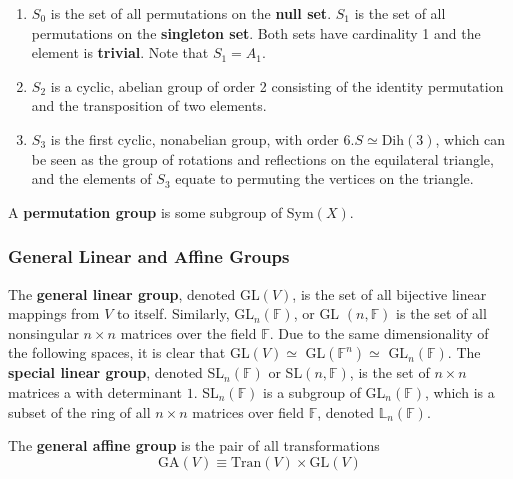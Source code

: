 \documentclass{article}
\begin{document}
      \begin{example}
      \begin{enumerate}
        \item $S_{0}$ is the set of all permutations on the \textbf{null set}. $S_{1}$ is the set of all permutations on the \textbf{singleton set}. Both sets have cardinality 1 and the element is \textbf{trivial}. Note that $S_{1} = A_{1}$. 
        \item $S_{2}$ is a cyclic, abelian group of order 2 consisting of the identity permutation and the transposition of two elements. 
        \item $S_{3}$ is the first cyclic, nonabelian group, with order 6.$S \simeq \text{Dih}(3)$, which can be seen as the group of rotations and reflections on the equilateral triangle, and the elements of $S_{3}$ equate to permuting the vertices on the triangle. 
      \end{enumerate}
      \end{example}

      \begin{definition}
        A \textbf{permutation group} is some subgroup of Sym$(X)$. 
      \end{definition}

    \subsubsection{General Linear and Affine Groups}

      \begin{definition}
        The \textbf{general linear group}, denoted GL$(V)$, is the set of all bijective linear mappings from $V$ to itself. Similarly, GL$_{n}(\mathbb{F})$, or GL $(n, \mathbb{F})$ is the set of all nonsingular $n \times n$ matrices over the field $\mathbb{F}$. Due to the same dimensionality of the following spaces, it is clear that GL$(V) \simeq$ GL$(\mathbb{F}^{n}) \simeq$ GL$_{n}(\mathbb{F})$. The \textbf{special linear group}, denoted SL$_{n} (\mathbb{F})$ or SL$(n, \mathbb{F})$, is the set of $n\times n$ matrices a with determinant $1$. SL$_{n}(\mathbb{F})$ is a subgroup of GL$_{n}(\mathbb{F})$, which is a subset of the ring of all $n \times n$ matrices over field $\mathbb{F}$, denoted $\mathbb{L}_{n}(\mathbb{F})$. 
      \end{definition}

      \begin{definition}
        The \textbf{general affine group} is the pair of all transformations
        \begin{equation}
          \text{GA} (V) \equiv \text{Tran}(V) \times \text{GL}(V)
        \end{equation}
      \end{definition}
\end{document}
